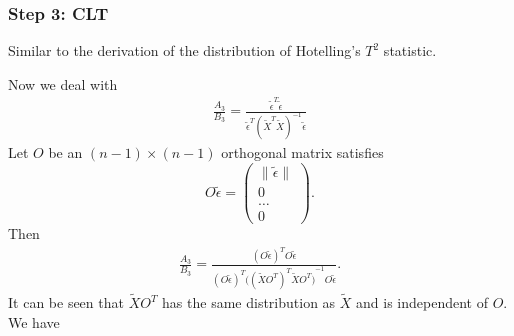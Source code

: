 \documentclass[review]{elsarticle}
\theoremstyle{plain}
\theoremstyle{definition}
\theoremstyle{remark}
\begin{document}
\subsubsection{Step 3: CLT}
Similar to the derivation of the distribution of Hotelling's $T^2$ statistic.

Now we deal with 
\begin{equation}
    \begin{aligned}
        \frac{A_3}{B_3}=\frac{\tilde{\epsilon}^T\tilde{\epsilon}
    }{\tilde{\epsilon}^T{(\tilde{X}^T\tilde{X})}^{-1}\tilde{\epsilon}
        }
    \end{aligned}
\end{equation}
Let $O$ be an $(n-1)\times (n-1)$ orthogonal matrix satisfies 
\[
    O\tilde{\epsilon}=
    \begin{pmatrix}
        \|\tilde{\epsilon}\|\\
        0\\
        \ldots\\
        0
    \end{pmatrix}.
    \]
Then
\begin{equation}
    \begin{aligned}
        \frac{A_3}{B_3}=\frac{{(O\tilde{\epsilon})}^T O\tilde{\epsilon}
        }{{(O\tilde{\epsilon})}^T{\big({(\tilde{X}O^T)}^T\tilde{X}O^T\big)}^{-1} O\tilde{\epsilon}
        }.
    \end{aligned}
\end{equation}
It can be seen that $\tilde{X}O^T$ has the same distribution as $\tilde{X}$ and is independent of $O$. We have
\end{document}
